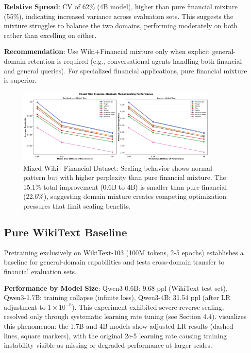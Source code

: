 \textbf{Relative Spread}: CV of 62\% (4B model), higher than pure financial mixture (55\%), indicating increased variance across evaluation sets. This suggests the mixture struggles to balance the two domains, performing moderately on both rather than excelling on either.

\textbf{Recommendation}: Use Wiki+Financial mixture only when explicit general-domain retention is required (e.g., conversational agents handling both financial and general queries). For specialized financial applications, pure financial mixture is superior.

\begin{figure}[h]
\centering
\includegraphics[width=0.9\textwidth]{figures/scaling_mixed_wiki_financial.png}
\caption[Mixed Wiki+Financial Dataset: Scaling Behavior]{Mixed Wiki+Financial Dataset: Scaling behavior shows normal pattern but with higher perplexity than pure financial mixture. The 15.1\% total improvement (0.6B to 4B) is smaller than pure financial (22.6\%), suggesting domain mixture creates competing optimization pressures that limit scaling benefits.}
\label{fig:scaling_mixed_wiki_financial}
\end{figure}



\subsection{Pure WikiText Baseline}

Pretraining exclusively on WikiText-103 (100M tokens, 2-5 epochs) establishes a baseline for general-domain capabilities and tests cross-domain transfer to financial evaluation sets.

\textbf{Performance by Model Size}: Qwen3-0.6B: 9.68 ppl (WikiText test set), Qwen3-1.7B: training collapse (infinite loss), Qwen3-4B: 31.54 ppl (after LR adjustment to $1 \times 10^{-5}$). This experiment exhibited severe reverse scaling, resolved only through systematic learning rate tuning (see Section 4.4).  visualizes this phenomenon: the 1.7B and 4B models show adjusted LR results (dashed lines, square markers), with the original 2e-5 learning rate causing training instability visible as missing or degraded performance at larger scales.

